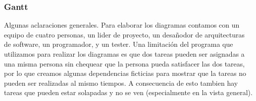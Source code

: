 
\subsubsection{Gantt}

Algunas aclaraciones generales. Para elaborar los diagramas contamos con un equipo de cuatro personas, un lider de proyecto, un desañodor de arquitecturas de software, un programador, y un tester. Una limitaci\'on del programa que utilizamos para realizar los diagramas es que dos tareas pueden ser asignadas a una misma persona sin chequear que la persona pueda satisfacer las dos tareas, por lo que creamos algunas dependencias ficticias para mostrar que la tareas no pueden ser realizadas al mismo tiempos. A consecuencia de esto tambien hay tareas que pueden estar solapadas y no se ven (especialmente en la vista general).

